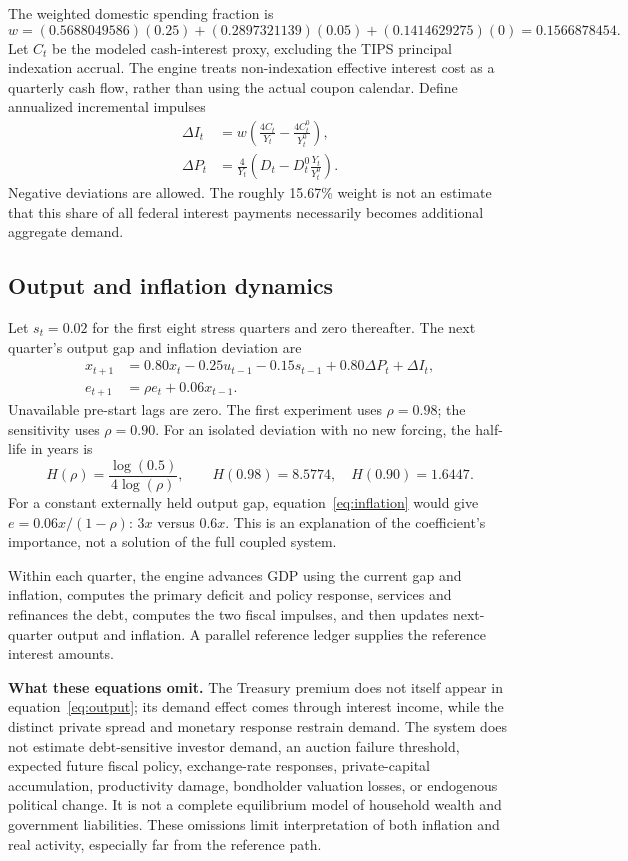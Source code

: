 \documentclass[11pt,letterpaper]{article}
\begin{document}
The weighted domestic spending fraction is
\[
 w=(0.5688049586)(0.25)+(0.2897321139)(0.05)
   +(0.1414629275)(0)=0.1566878454.
\]
Let \(C_t\) be the modeled cash-interest proxy, excluding the TIPS principal
indexation accrual. The engine treats non-indexation effective interest cost
as a quarterly cash flow, rather than using the actual coupon calendar.
Define annualized incremental impulses
\begin{align}
 \Delta I_t&=w\left(\frac{4C_t}{Y_t}-\frac{4C^0_t}{Y^0_t}\right),\\
 \Delta P_t&=\frac{4}{Y_t}
   \left(D_t-D^0_t\frac{Y_t}{Y^0_t}\right).
\end{align}
Negative deviations are allowed. The roughly 15.67\% weight is not an estimate
that this share of all federal interest payments necessarily becomes
additional aggregate demand.

\subsection*{Output and inflation dynamics}

Let \(s_t=0.02\) for the first eight stress quarters and zero thereafter.
The next quarter's output gap and inflation deviation are
\begin{align}
 x_{t+1}
 &=0.80x_t-0.25u_{t-1}-0.15s_{t-1}
     +0.80\Delta P_t+\Delta I_t, \label{eq:output}\\
 e_{t+1}&=\rho e_t+0.06x_{t-1}. \label{eq:inflation}
\end{align}
Unavailable pre-start lags are zero. The first experiment uses \(\rho=0.98\);
the sensitivity uses \(\rho=0.90\). For an isolated deviation with no new
forcing, the half-life in years is
\[
 H(\rho)=\frac{\log(0.5)}{4\log(\rho)},
 \qquad H(0.98)=8.5774,\quad H(0.90)=1.6447.
\]
For a constant externally held output gap, equation~\eqref{eq:inflation}
would give \(e=0.06x/(1-\rho)\): \(3x\) versus \(0.6x\).
This is an explanation of the coefficient's importance, not a solution of
the full coupled system.

Within each quarter, the engine advances GDP using the current gap and
inflation, computes the primary deficit and policy response, services and
refinances the debt, computes the two fiscal impulses, and then updates
next-quarter output and inflation. A parallel reference ledger supplies
the reference interest amounts.

\textbf{What these equations omit.}
The Treasury premium does not itself appear in
equation~\eqref{eq:output}; its demand effect comes through interest income,
while the distinct private spread and monetary response restrain demand.
The system does not estimate debt-sensitive investor demand, an auction
failure threshold, expected future fiscal policy, exchange-rate responses,
private-capital accumulation, productivity damage, bondholder valuation
losses, or endogenous political change. It is not a complete equilibrium
model of household wealth and government liabilities. These omissions limit
interpretation of both inflation and real activity, especially far from the
reference path.
\end{document}
